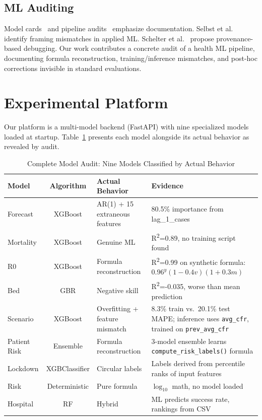 \documentclass{ieeeaccess}
\begin{document}
\subsection{ML Auditing}
Model cards~\cite{mitchell2019} and pipeline audits~\cite{rajkomar2022} emphasize documentation. Selbst et al.~\cite{selbst2019} identify framing mismatches in applied ML. Schelter et al.~\cite{schelter2023} propose provenance-based debugging. Our work contributes a concrete audit of a health ML pipeline, documenting formula reconstruction, training/inference mismatches, and post-hoc corrections invisible in standard evaluations.

\section{Experimental Platform}
\label{sec:arch}

Our platform is a multi-model backend (FastAPI) with nine specialized models loaded at startup. Table~\ref{tab:model_audit} presents each model alongside its actual behavior as revealed by audit.

\begin{table}[h]
\centering
\caption{Complete Model Audit: Nine Models Classified by Actual Behavior}
\label{tab:model_audit}
\small
\begin{tabular}{lclp{5.5cm}}
\toprule
Model & Algorithm & Actual Behavior & Evidence \\
\midrule
Forecast & XGBoost & AR(1) + 15 extraneous features & 80.5\% importance from lag\_1\_cases \\
Mortality & XGBoost & Genuine ML & R\textsuperscript{2}=0.89, no training script found \\
R0 & XGBoost & Formula reconstruction & R\textsuperscript{2}=0.99 on synthetic formula: $0.96^y (1-0.4v)(1+0.3m)$ \\
Bed & GBR & Negative skill & R\textsuperscript{2}=-0.035, worse than mean prediction \\
Scenario & XGBoost & Overfitting + feature mismatch & 8.3\% train vs.\ 20.1\% test MAPE; inference uses \texttt{avg\_cfr}, trained on \texttt{prev\_avg\_cfr} \\
Patient Risk & Ensemble & Formula reconstruction & 3-model ensemble learns \texttt{compute\_risk\_labels()} formula \\
Lockdown & XGBClassifier & Circular labels & Labels derived from percentile ranks of input features \\
Risk & Deterministic & Pure formula & $\log_{10}$ math, no model loaded \\
Hospital & RF & Hybrid & ML predicts success rate, rankings from CSV \\
\bottomrule
\end{tabular}
\end{table}
\end{document}
